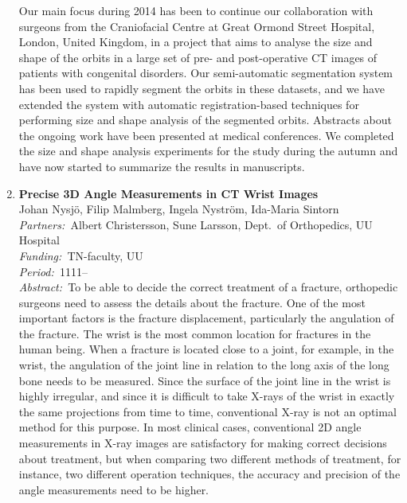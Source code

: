 \documentclass[10pt, a4paper]{article}
\newcommand{\aabstract}[1]{\emph{Abstract:~}#1}
\newcommand{\ffunding}[1]{\emph{Funding:~}#1\\}
\newcommand{\ppartners}[1]{\emph{Partners:~}#1\\}
\newcommand{\pperiod}[1]{\emph{Period:~}#1\\}
\begin{document}
\begin{enumerate}
{Our main focus during 2014 has been to continue our collaboration with surgeons from the Craniofacial Centre at Great Ormond Street Hospital, London, United Kingdom, in a project that aims to analyse the size and shape of the orbits in a large set of pre- and post-operative CT images of patients with congenital disorders. Our semi-automatic segmentation system has been used to rapidly segment the orbits in these datasets, and we have extended the system with automatic registration-based techniques for performing size and shape analysis of the segmented orbits. Abstracts about the ongoing work have been presented at medical conferences. We completed the size and shape analysis experiments for the study during the autumn and have now started to summarize the results in manuscripts.}


\item 
\label{project:wrist_angle_measurements}
\textbf{Precise 3D Angle Measurements in CT Wrist Images}\\
Johan Nysj{\"o}, Filip Malmberg, Ingela Nystr{\"o}m, Ida-Maria Sintorn\\
\ppartners{Albert Christersson, Sune Larsson, Dept.~of Orthopedics, UU Hospital}
\ffunding{TN-faculty, UU}
\pperiod{1111--}
\aabstract{To be able to decide the correct treatment of a fracture, orthopedic surgeons need to assess the details about the fracture. One of the most important factors is the fracture displacement, particularly the angulation of the fracture. The wrist is the most common location for fractures in the human being. When a fracture is located close to a joint, for example, in the wrist,  the angulation of the joint line in relation to the long axis of the long bone needs to be measured. Since the surface of the joint line in the wrist is highly irregular, and since it is difficult to take X-rays of the wrist in exactly the same projections from time to time, conventional X-ray is not an optimal method for this purpose. In most clinical cases, conventional 2D angle measurements in X-ray images are satisfactory for making correct decisions about treatment, but when comparing two different methods of treatment, for instance, two different operation techniques, the accuracy and precision of the angle measurements need to be higher.

}
\end{enumerate}
\end{document}
